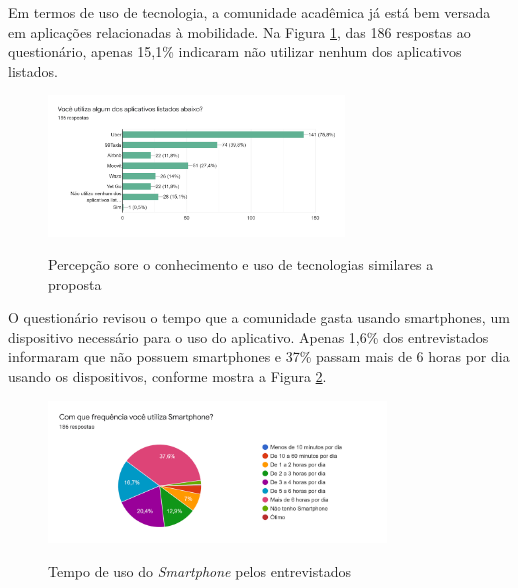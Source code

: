 Em termos de uso de tecnologia, a comunidade acadêmica já está bem versada em aplicações relacionadas à mobilidade. Na Figura \ref{fig:conhecimento-sobre-apps}, das 186 respostas ao questionário, apenas 15,1\% indicaram não utilizar nenhum dos aplicativos listados.

\begin{figure}[!hbtp]
	\centering
	\caption{Percepção sore o conhecimento e uso de tecnologias similares a proposta}
	\includegraphics[width=0.7\textwidth]{./04-figuras/questionario/16.png}
	\label{fig:conhecimento-sobre-apps}
\end{figure}

O questionário revisou o tempo que a comunidade gasta usando smartphones, um dispositivo necessário para o uso do aplicativo. Apenas 1,6\% dos entrevistados informaram que não possuem smartphones e 37\% passam mais de 6 horas por dia usando os dispositivos, conforme mostra a Figura \ref{fig:usodosmartphone}.

\begin{figure}[!hbtp]
	\centering
	\caption{Tempo de uso do \textit{Smartphone} pelos entrevistados}
	\includegraphics[width=0.8\textwidth]{./04-figuras/questionario/17.png}
	\label{fig:usodosmartphone}
\end{figure}

